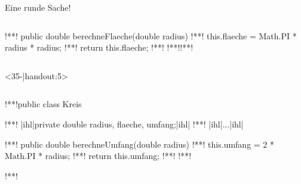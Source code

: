 \begin{frame}[c,fragile]{Eine runde Sache!}
\begin{onlyenv}
\begin{columns}[c,onlytextwidth]
\begin{plainjava}
{!**!   public double berechneFlaeche(double radius) {
!**!       this.flaeche = Math.PI * radius * radius;
!**!       return this.flaeche;
!**!   }
!**!}!**!
\end{plainjava}
\end{columns}
\end{onlyenv}
\begin{onlyenv}<35-|handout:5>
\begin{columns}[c,onlytextwidth]
\footnotesize{}
\SetupLstHl
\begin{plainjava}
!**!public class Kreis {
!**!   |ihl|private double radius, flaeche, umfang;|ihl|
!**!   |ihl|...|ihl|

!**!   public double berechneUmfang(double radius) {
!**!       this.umfang = 2 * Math.PI * radius;
!**!       return this.umfang;
!**!   }
!**!}!**!
\end{plainjava}
\end{columns}
\end{onlyenv}
\end{frame}

